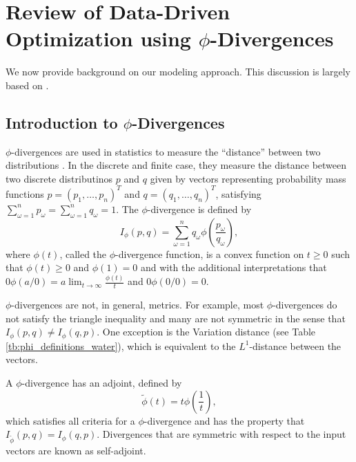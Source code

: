 \documentclass[11pt]{article}
\theoremstyle{plain}
\theoremstyle{definition}
\theoremstyle{remark}
\newcommand{\plp}{$\phi$LP-2}
\begin{document}
\section{Review of Data-Driven Optimization using $\phi$-Divergences}
\label{sec:phi_divergences_water}

We now provide background on our modeling approach.
This discussion is largely based on \citep{love2013phi}.

\subsection{Introduction to $\phi$-Divergences}

$\phi$-divergences are used in statistics to measure the ``distance'' between two distributions \citep{pardo2005statistical}. 
In the discrete and finite case, they measure the distance between two discrete distributinos $p$ and $q$ given by vectors representing probability mass functions $p = (p_1, \dots, p_n)^T$ and $q = (q_1, \dots, q_n)^T$, satisfying $\sum_{\omega=1}^n p_\omega = \sum_{\omega=1}^n q_\omega = 1$.
The $\phi$-divergence is defined by
\[
	I_\phi(p,q) = \sum_{\omega=1}^n q_\omega \phi\left(\frac{p_\omega}{q_\omega}\right),
\]
where $\phi(t)$, called the $\phi$-divergence function, is a convex function on $t \geq 0$ such that $\phi(t) \geq 0$ and $\phi(1) = 0$ and with the additional interpretations that $0 \phi(a/0) = a \lim_{t \rightarrow \infty} \frac{\phi(t)}{t}$ and $0 \phi(0/0) = 0$.

$\phi$-divergences are not, in general, metrics.
For example, most $\phi$-divergences do not satisfy the triangle inequality and many are not symmetric in the sense that $I_\phi(p,q) \neq I_\phi(q,p)$.
One exception is the Variation distance (see Table \ref{tb:phi_definitions_water}), which is equivalent to the $L^1$-distance between the vectors.

A $\phi$-divergence has an adjoint, defined by
\begin{equation} \label{eq:adjoint_water}
	\tilde{\phi}(t) = t \phi\left(\frac{1}{t}\right),
\end{equation}
which satisfies all criteria for a $\phi$-divergence \citep{bental1991certainty} and has the property that $I_{\tilde{\phi}}(p,q) = I_\phi(q,p)$.
Divergences that are symmetric with respect to the input vectors are known as self-adjoint.
\end{document}
